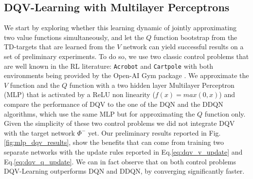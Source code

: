 \subsection{DQV-Learning with Multilayer Perceptrons}
We start by exploring whether this learning dynamic of jointly approximating two value functions simultaneously, and let the $Q$ function bootstrap from the TD-targets that are learned from the $V$ network can yield successful results on a set of preliminary experiments. To do so, we use two classic control problems that are well known in the RL literature: \texttt{Acrobot} \cite{sutton1996generalization} and \texttt{Cartpole} \cite{barto1983neuronlike} with both environments being provided by the Open-AI Gym package \cite{brockman2016openai}. We approximate the $V$ function and the $Q$ function with a two hidden layer Multilayer Perceptron (MLP) that is activated by a ReLU non linearity ($f(x) = max (0,x)$) and compare the performance of DQV to the one of the DQN and the DDQN algorithms, which use the same MLP but for approximating the $Q$ function only. Given the simplicity of these two control problems we did not integrate DQV with the target network $\Phi^{-}$ yet. Our preliminary results reported in Fig. \ref{fig:mlp_dqv_results}, show the benefits that can come from training two separate networks with the update rules reported in Eq.\ref{eq:dqv_v_update} and Eq.\ref{eq:dqv_q_update}. We can in fact observe that on both control problems DQV-Learning outperforms DQN and DDQN, by converging significantly faster. 




